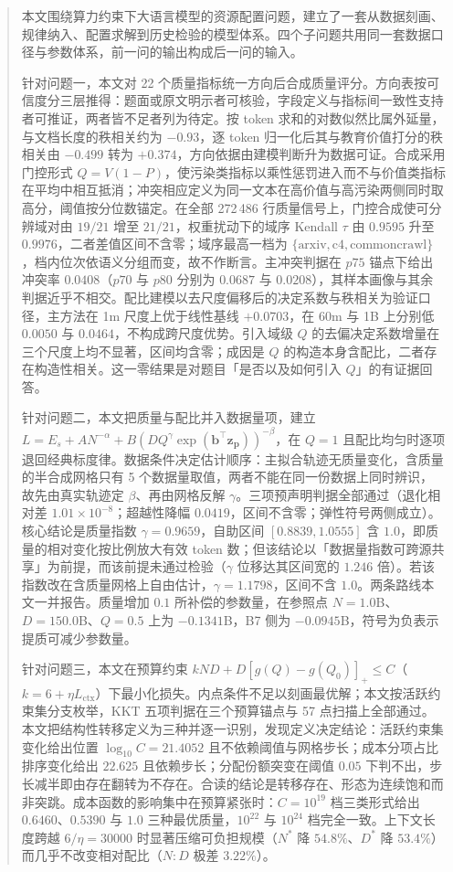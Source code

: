 \begin{abstract}

本文围绕算力约束下大语言模型的资源配置问题，建立了一套从数据刻画、规律纳入、配置求解到历史检验的模型体系。四个子问题共用同一套数据口径与参数体系，前一问的输出构成后一问的输入。

针对问题一，本文对 22 个质量指标统一方向后合成质量评分。方向表按可信度分三层推得：题面或原文明示者可核验，字段定义与指标间一致性支持者可推证，两者皆不足者列为待定。按 token 求和的对数似然比属外延量，与文档长度的秩相关约为 $-0.93$，逐 token 归一化后其与教育价值打分的秩相关由 $-0.499$ 转为 $+0.374$，方向依据由建模判断升为数据可证。合成采用门控形式 $Q=V(1-P)$，使污染类指标以乘性惩罚进入而不与价值类指标在平均中相互抵消；冲突相应定义为同一文本在高价值与高污染两侧同时取高分，阈值按分位数锚定。在全部 272\,486 行质量信号上，门控合成使可分辨域对由 $19/21$ 增至 $21/21$，权重扰动下的域序 Kendall $\tau$ 由 $0.9595$ 升至 $0.9976$，二者差值区间不含零；域序最高一档为 $\{\text{arxiv},\text{c4},\text{commoncrawl}\}$，档内位次依语义分组而变，故不作断言。主冲突判据在 $p75$ 锚点下给出冲突率 $0.0408$（$p70$ 与 $p80$ 分别为 $0.0687$ 与 $0.0208$），其样本画像与其余判据近乎不相交。配比建模以去尺度偏移后的决定系数与秩相关为验证口径，主方法在 1m 尺度上优于线性基线 $+0.0703$，在 60m 与 1B 上分别低 $0.0050$ 与 $0.0464$，不构成跨尺度优势。引入域级 $Q$ 的去偏决定系数增量在三个尺度上均不显著，区间均含零；成因是 $Q$ 的构造本身含配比，二者存在构造性相关。这一零结果是对题目「是否以及如何引入 $Q$」的有证据回答。

针对问题二，本文把质量与配比并入数据量项，建立\linebreak $L=E_s+\allowbreak AN^{-\alpha}+\allowbreak B(DQ^{\gamma}\exp(\boldsymbol{b}^{\top}\boldsymbol{z}_{\boldsymbol{p}}))^{-\beta}$，在 $Q=1$ 且配比均匀时逐项退回经典标度律。数据条件决定估计顺序：主拟合轨迹无质量变化，含质量的半合成网格只有 5 个数据量取值，两者不能在同一份数据上同时辨识，故先由真实轨迹定 $\beta$、再由网格反解 $\gamma$。三项预声明判据全部通过（退化相对差 $1.01\times10^{-8}$；超越性降幅 $0.0419$，区间不含零；弹性符号两侧成立）。核心结论是质量指数 $\gamma=0.9659$，自助区间 $[0.8839,1.0555]$ 含 $1.0$，即质量的相对变化按比例放大有效 token 数；但该结论以「数据量指数可跨源共享」为前提，而该前提未通过检验（$\gamma$ 位移达其区间宽的 $1.246$ 倍）。若该指数改在含质量网格上自由估计，$\gamma=1.1798$，区间不含 $1.0$。两条路线本文一并报告。质量增加 $0.1$ 所补偿的参数量，在参照点 $N=1.0$B、$D=150.0$B、$Q=0.5$ 上为 $-0.1341$B，B7 侧为 $-0.0945$B，符号为负表示提质可减少参数量。

针对问题三，本文在预算约束 $kND+D[g(Q)-g(Q_0)]_+\le C$（$k=6+\eta L_{\text{ctx}}$）下最小化损失。内点条件不足以刻画最优解；本文按活跃约束集分支枚举，KKT 五项判据在三个预算锚点与 57 点扫描上全部通过。本文把结构性转移定义为三种并逐一识别，发现定义决定结论：活跃约束集变化给出位置 $\log_{10}C=21.4052$ 且不依赖阈值与网格步长；成本分项占比排序变化给出 $22.625$ 且依赖步长；分配份额突变在阈值 $0.05$ 下判不出，步长减半即由存在翻转为不存在。合读的结论是转移存在、形态为连续饱和而非突跳。成本函数的影响集中在预算紧张时：$C=10^{19}$ 档三类形式给出 $0.6460$、$0.5390$ 与 $1.0$ 三种最优质量，$10^{22}$ 与 $10^{24}$ 档完全一致。上下文长度跨越 $6/\eta=30000$ 时显著压缩可负担规模（$N^{*}$ 降 $54.8\%$、$D^{*}$ 降 $53.4\%$）而几乎不改变相对配比（$N{:}D$ 极差 $3.22\%$）。


\end{abstract}
